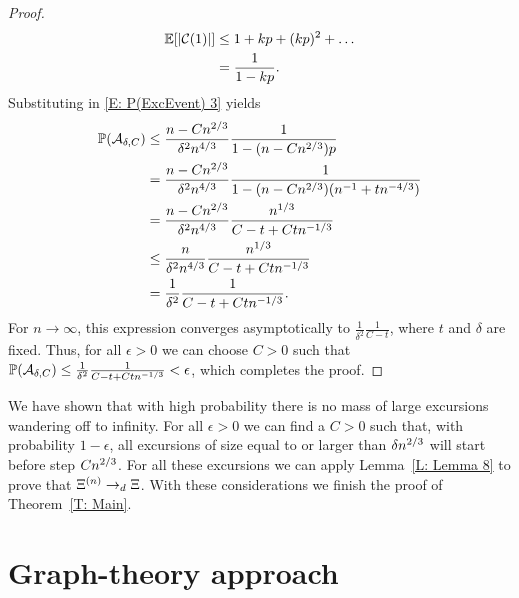 \begin{proof}
	\begin{align*}
	\mathbb{E}[|\mathcal{C}(1)|] 
	&\leq 1 + kp + (kp)^2 + \dots \\
	&= \frac{1}{1-kp}.
	\end{align*}
	Substituting in \eqref{E: P(ExcEvent) 3} yields
	\begin{equation}
	\begin{aligned}
	\mathbb{P}(\mathcal{A}_{\delta, C}) 
	&\leq \frac{n-Cn^{2 / 3}}{\delta^2 n^{4 / 3}} \frac{1}{1-(n-Cn^{2 / 3})p} \\
	&= \frac{n-Cn^{2 / 3}}{\delta^2 n^{4 / 3}} \frac{1}{1-(n-Cn^{2 / 3})(n^{-1} + tn^{-4 / 3})} \\
	&= \frac{n-Cn^{2 / 3}}{\delta^2 n^{4 / 3}} \frac{n^{1 / 3}}{C-t+Ctn^{-1 / 3}} \\
	&\leq \frac{n}{\delta^2 n^{4 / 3}} \frac{n^{1 / 3}}{C-t+Ctn^{-1 / 3}} \\
	&= \frac{1}{\delta^2} \frac{1}{C-t+Ctn^{-1 / 3}}.
	\end{aligned}
	\end{equation}
	For $n \rightarrow \infty$, 
	this expression converges asymptotically to $\frac{1}{\delta^2} \frac{1}{C-t}$,
	where $t$ and $\delta$ are fixed.
	Thus, for all $\epsilon>0$ we can choose $C>0$ such that
	$\mathbb{P}(\mathcal{A}_{\delta, C}) \leq \frac{1}{\delta^2} \frac{1}{C-t+Ctn^{-1 / 3}} < \epsilon$,
	which completes the proof.
\end{proof}

We have shown that with high probability there is no mass of large excursions wandering off to infinity.
For all $\epsilon>0$ we can find a $C>0$ such that,
with probability $1-\epsilon$,
all excursions of size equal to or larger than $\delta n^{2 / 3}$ will start before step $Cn^{2 / 3}$.
For all these excursions we can apply Lemma~\ref{L: Lemma 8} to prove that $\Xi^{(n)} \rightarrow_d \Xi$.
With these considerations we finish the proof of Theorem~\ref{T: Main}.

\section{Graph-theory approach}



